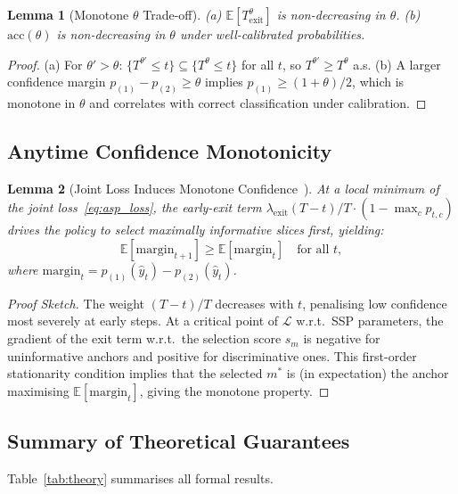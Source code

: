 \documentclass[11pt,a4paper]{article}
\newtheorem{lemma}{Lemma}[section]
\begin{document}
\begin{lemma}[Monotone $\theta$ Trade-off]
\label{lem:monotone_theta}
(a) $\mathbb{E}[T^\theta_\mathrm{exit}]$ is non-decreasing in $\theta$.
(b) $\mathrm{acc}(\theta)$ is non-decreasing in $\theta$ under well-calibrated probabilities.
\end{lemma}
\begin{proof}
(a) For $\theta'>\theta$: $\{T^{\theta'}\leq t\}\subseteq\{T^\theta\leq t\}$ for
all $t$, so $T^{\theta'}\geq T^\theta$ a.s.
(b) A larger confidence margin $p_{(1)}-p_{(2)}\geq\theta$ implies $p_{(1)}\geq
(1+\theta)/2$, which is monotone in $\theta$ and correlates with correct classification
under calibration.
\end{proof}

\subsection{Anytime Confidence Monotonicity}

\begin{lemma}[Joint Loss Induces Monotone Confidence~{\cite{teerapittayanon2016,graves2016}}]
\label{lem:anytime}
At a local minimum of the joint loss~\eqref{eq:asp_loss}, the early-exit term
$\lambda_\mathrm{exit}(T-t)/T\cdot(1-\max_c p_{t,c})$ drives the policy to select
maximally informative slices first, yielding:
\[
  \mathbb{E}[\mathrm{margin}_{t+1}] \geq \mathbb{E}[\mathrm{margin}_t]
  \quad \text{for all } t,
\]
where $\mathrm{margin}_t=p_{(1)}(\hat{y}_t)-p_{(2)}(\hat{y}_t)$.
\end{lemma}
\begin{proof}[Proof Sketch]
The weight $(T-t)/T$ decreases with $t$, penalising low confidence most severely
at early steps.  At a critical point of $\mathcal{L}$ w.r.t.\ SSP parameters,
the gradient of the exit term w.r.t.\ the selection score $s_m$ is negative for
uninformative anchors and positive for discriminative ones.  This first-order
stationarity condition implies that the selected $m^*$ is (in expectation) the
anchor maximising $\mathbb{E}[\mathrm{margin}_t]$, giving the monotone property.
\end{proof}

\subsection{Summary of Theoretical Guarantees}

Table~\ref{tab:theory} summarises all formal results.
\end{document}
